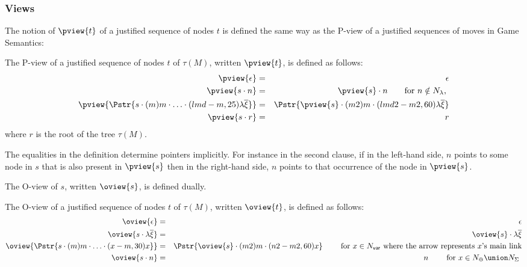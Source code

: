 \subsubsection{Views}
The notion of  $\pview{t}$ of a justified sequence
of nodes $t$ is defined the same way as the P-view of a justified
sequences of moves in Game Semantics:

\begin{definition}
The P-view of a justified sequence of nodes $t$ of $\tau(M)$, written $\pview{t}$, is defined as follows:
\begin{eqnarray*}
 \pview{\epsilon} &=&  \epsilon \\
 \pview{s \cdot n }  &=&  \pview{s} \cdot n \qquad \mbox{for $n \notin N_\lambda$, }\\
 \pview{\Pstr{ s \cdot (m){m} \cdot \ldots \cdot (lmd-m,25){\lambda \overline{\xi}}}} &=&
        \Pstr{ \pview{s} \cdot (m2){m} \cdot (lmd2-m2,60){\lambda \overline{\xi}} } \\
 \pview{s \cdot r }  &=&  r
\end{eqnarray*}
where $r$ is the root of the tree $\tau(M)$.

The equalities in the definition determine pointers implicitly. For
instance in the second clause, if in the left-hand side, $n$ points
to some node in $s$  that is also present in $\pview{s}$ then in the
right-hand side, $n$ points to that occurrence of the node in
$\pview{s}$.
\end{definition}

The O-view of $s$, written $\oview{s}$, is defined dually.
\begin{definition}
The O-view of a justified sequence of nodes $t$ of $\tau(M)$, written $\oview{t}$, is defined as follows:
\begin{eqnarray*}
 \oview{\epsilon} &=&  \epsilon \\
 \oview{s \cdot \lambda \overline{\xi} }  &=&  \oview{s} \cdot \lambda \overline{\xi} \\
 \oview{\Pstr{s \cdot (m){m} \cdot \ldots \cdot (x-m,30){x}}} &=&
    \Pstr{ \oview{s} \cdot (m2){m} \cdot (n2-m2,60){x} } \qquad \mbox{ for $x \in N_{\sf var}$ where the arrow represents $x$'s main link}\\
 \oview{s \cdot n }  &=&  n \qquad \mbox{ for $x \in N_@ \union N_\Sigma$ }
\end{eqnarray*}
\end{definition}

